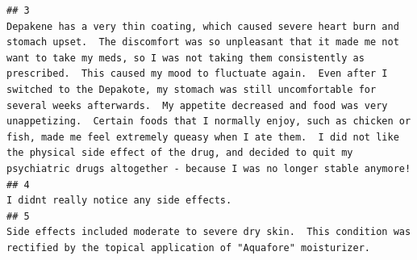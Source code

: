 \documentclass[spanish,]{article}
\begin{document}
\begin{verbatim}
## 3                                                                                                                                                                                                                                                                                                     Depakene has a very thin coating, which caused severe heart burn and stomach upset.  The discomfort was so unpleasant that it made me not want to take my meds, so I was not taking them consistently as prescribed.  This caused my mood to fluctuate again.  Even after I switched to the Depakote, my stomach was still uncomfortable for several weeks afterwards.  My appetite decreased and food was very unappetizing.  Certain foods that I normally enjoy, such as chicken or fish, made me feel extremely queasy when I ate them.  I did not like the physical side effect of the drug, and decided to quit my psychiatric drugs altogether - because I was no longer stable anymore!
## 4                                                                                                                                                                                                                                                                                                                                                                                                                                                                                                                                                                                                                                                                                                                                                                                                                                                                                                                                                             I didnt really notice any side effects.
## 5                                                                                                                                                                                                                                                                                                                                                                                                                                                                                                                                                                                                                                                                                                                                                                                                                                                              Side effects included moderate to severe dry skin.  This condition was rectified by the topical application of "Aquafore" moisturizer.

\end{verbatim}
\end{document}
